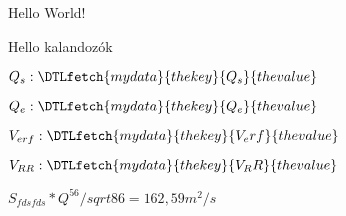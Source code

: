 \documentclass[12pt]{article}
\newcommand{\var}[1]{\DTLfetch{mydata}{thekey}{#1}{thevalue}}
\begin{document}
Hello World!

Hello kalandozók

$Q{_s}: \var{Q_s}$ 

$Q{_e}: \var{Q_e}$

$V_{erf}: \var{V_erf}$

$V_{RR}: \var{V_RR}$

$S_{fdsfds} * Q^56 / sqrt{86} = 162,59 m^2/s  $
\end{document}
